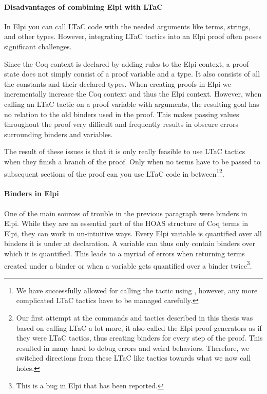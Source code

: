 \documentclass[thesis.tex]{subfiles}
\begin{document}
\paragraph{Disadvantages of combining Elpi with LTaC}
In Elpi you can call LTaC code with the needed arguments like terms, strings, and other types. However, integrating LTaC tactics into an Elpi proof often poses significant challenges.

Since the Coq context is declared by adding rules to the Elpi context, a proof state does not simply consist of a proof variable and a type. It also consists of all the constants and their declared types. When creating proofs in Elpi we incrementally increase the Coq context and thus the Elpi context. However, when calling an LTaC tactic on a proof variable with arguments, the resulting goal has no relation to the old binders used in the proof. This makes passing values throughout the proof very difficult and frequently results in obscure errors surrounding binders and variables.

The result of these issues is that it is only really feasible to use LTaC tactics when they finish a branch of the proof. Only when no terms have to be passed to subsequent sections of the proof can you use LTaC code in between\footnote{We have successfully allowed for calling the  tactic using , however, any more complicated LTaC tactics have to be managed carefully.}\footnote{Our first attempt at the commands and tactics described in this thesis was based on calling LTaC a lot more, it also called the Elpi proof generators as if they were LTaC tactics, thus creating binders for every step of the proof. This resulted in many hard to debug errors and weird behaviors. Therefore, we switched directions from these LTaC like tactics towards what we now call holes.}.

\paragraph{Binders in Elpi}
One of the main sources of trouble in the previous paragraph were binders in Elpi. While they are an essential part of the HOAS structure of Coq terms in Elpi, they can work in un-intuitive ways. Every Elpi variable is quantified over all binders it is under at declaration. A variable can thus only contain binders over which it is quantified. This leads to a myriad of errors when returning terms created under a binder or when a variable gets quantified over a binder twice\footnote{This is a bug in Elpi that has been reported.}.
\end{document}
